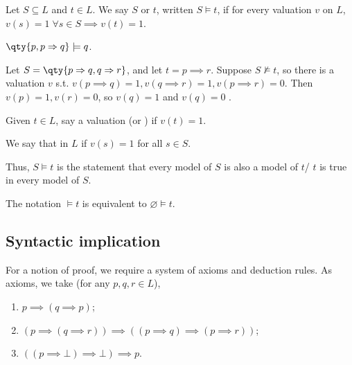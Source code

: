 \begin{definition}
    Let $S \subseteq L$ and $t \in L$.
    We say $S$  or  $t$, written $S \models t$, if for every valuation $v$ on $L$, $v(s) = 1 \; \forall s \in S \implies v(t) = 1$.
\end{definition}

\begin{example}
    $\qty{p, p \implies q} \models q$.
\end{example}

\begin{example}
    Let $S = \qty{p \implies q, q \implies r}$, and let $t = p \implies r$.
    Suppose $S \not\models t$, so there is a valuation $v$ s.t. $v(p \implies q) = 1, v(q \implies r) = 1, v(p \implies r) = 0$.
    Then $v(p) = 1, v(r) = 0$, so $v(q) = 1$ and $v(q) = 0$ \Lightning.
\end{example}

\begin{definition}[Model]
    Given $t \in L$, say a valuation  (or ) if $v(t) = 1$.
\end{definition}

\begin{definition}[Model]
    We say that  in $L$ if $v(s) = 1$ for all $s \in S$.
\end{definition}

Thus, $S \models t$ is the statement that every model of $S$ is also a model of $t$/ $t$ is true in every model of $S$.

\begin{remark}
    The notation $\models t$ is equivalent to $\varnothing \models t$.
\end{remark}

\subsection{Syntactic implication}
For a notion of proof, we require a system of axioms and deduction rules.
As axioms, we take (for any $p, q, r \in L$),
\begin{enumerate}
    \item $p \implies (q \implies p)$;
    \item $(p \implies (q \implies r)) \implies ((p \implies q) \implies (p \implies r))$;
    \item $((p \implies \bot) \implies \bot) \implies p$.
\end{enumerate}

